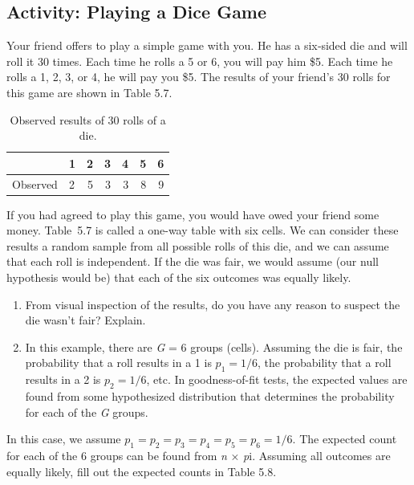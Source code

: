 \documentclass[
]{book}
\begin{document}
\hypertarget{activity-playing-a-dice-game}{%
\subsection*{Activity: Playing a Dice Game}\label{activity-playing-a-dice-game}}

Your friend offers to play a simple game with you. He has a six‑sided die and will roll it 30 times. Each time he rolls a 5 or 6, you will pay him \$5. Each time he rolls a 1, 2, 3, or 4, he will pay you \$5. The results of your friend's 30 rolls for this game are shown in Table 5.7.

\begin{table}[!h]
\centering
\caption{\label{tab:tab57}Observed results of 30 rolls of a die.}
\centering
\begin{tabular}[t]{llrrrrr}
\toprule
  & 1 & 2 & 3 & 4 & 5 & 6\\
\midrule
Observed & 2 & 5 & 3 & 3 & 8 & 9\\
\bottomrule
\end{tabular}
\end{table}

If you had agreed to play this game, you would have owed your friend some money. Table~5.7 is called a one-way table with six cells. We can consider these results a random sample from all possible rolls of this die, and we can assume that each roll is independent. If the die was fair, we would assume (our null hypothesis would be) that each of the six outcomes was equally likely.

\begin{enumerate}
\def\labelenumi{\arabic{enumi}.}
\setcounter{enumi}{31}
\item
  From visual inspection of the results, do you have any reason to suspect the die wasn't fair? Explain.
\item
  In this example, there are \emph{G} = 6 groups (cells). Assuming the die is fair, the probability that a roll results in a 1 is \(p_1 = 1/6\), the probability that a roll results in a 2 is \(p_2 = 1/6\), etc. In goodness-of-fit tests, the expected values are found from some hypothesized distribution that determines the probability for each of the \emph{G} groups.
\end{enumerate}

In this case, we assume \(p_1 = p_2 = p_3 = p_4 = p_5 = p_6 = 1/6\). The expected count for each of the 6 groups can be found from \emph{n} × \emph{p}i. Assuming all outcomes are equally likely, fill out the expected counts in Table 5.8.
\end{document}
